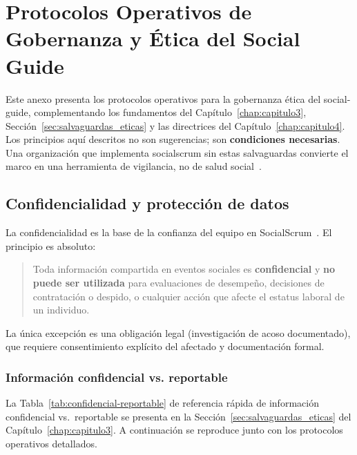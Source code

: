 \chapter{Protocolos Operativos de Gobernanza y Ética del Social Guide}
\label{anexo:protocolos-eticos}

Este anexo presenta los protocolos operativos para la gobernanza ética del \gls{social-guide}, complementando los fundamentos del Capítulo~\ref{chap:capitulo3}, Sección~\ref{sec:salvaguardas_eticas} y las directrices del Capítulo~\ref{chap:capitulo4}. Los principios aquí descritos no son sugerencias; son \textbf{condiciones necesarias}. Una organización que implementa \gls{socialscrum} sin estas salvaguardas convierte el marco en una herramienta de vigilancia, no de salud social~\cite{edmondson2018fearless, edmondson1999psychological}.

\section{Confidencialidad y protección de datos}

La confidencialidad es la base de la confianza del equipo en SocialScrum~\cite{mayer1995integrative}. El principio es absoluto:

\begin{quote}
    Toda información compartida en eventos sociales es \textbf{confidencial} y \textbf{no puede ser utilizada} para evaluaciones de desempeño, decisiones de contratación o despido, o cualquier acción que afecte el estatus laboral de un individuo.
\end{quote}

La única excepción es una obligación legal (investigación de acoso documentado), que requiere consentimiento explícito del afectado y documentación formal.

\subsection{Información confidencial vs. reportable}

La Tabla~\ref{tab:confidencial-reportable} de referencia rápida de información confidencial vs.\ reportable se presenta en la Sección~\ref{sec:salvaguardas_eticas} del Capítulo~\ref{chap:capitulo3}. A continuación se reproduce junto con los protocolos operativos detallados.

\begingroup
\scriptsize
\renewcommand{\arraystretch}{1.3}
\setlength{\tabcolsep}{4pt}
\setlength{\LTleft}{0pt}
\setlength{\LTright}{0pt}

